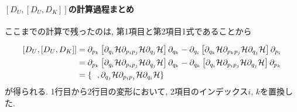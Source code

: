 \paragraph{$[D_{U} , [D_{U} , D_{K}]]$の計算過程まとめ}

ここまでの計算で残ったのは, 第1項目と第2項目1式であることから

\begin{align}
  \left[D_{U}, [D_{U}, D_{K}]\right]
  &=
  \partial_{p_{k}}
  \left[
    \partial_{q_{i}}       \mathcal{H}
    \partial_{p_{i} p_{j}} \mathcal{H}
    \partial_{q_{j}}       \mathcal{H}
  \right]
  \partial_{q_{k}}
  -
  \partial_{q_{i}}
  \left[
    \partial_{q_{k}}       \mathcal{H}
    \partial_{p_{k} p_{j}} \mathcal{H}
    \partial_{q_{j}}       \mathcal{H}
  \right]
  \partial_{p_{i}}
  \notag \\
  &=
  \partial_{p_{k}}
  \left[
    \partial_{q_{i}}       \mathcal{H}
    \partial_{p_{i} p_{j}} \mathcal{H}
    \partial_{q_{j}}       \mathcal{H}
  \right]
  \partial_{q_{k}}
  -
  \partial_{q_{k}}
  \left[
    \partial_{q_{i}}       \mathcal{H}
    \partial_{p_{i} p_{j}} \mathcal{H}
    \partial_{q_{j}}       \mathcal{H}
  \right]
  \partial_{p_{k}}
  \notag \\
  &=
  \{~~,
  \partial_{q_{j}}       \mathcal{H}
  \partial_{p_{i} p_{j}} \mathcal{H}
  \partial_{q_{i}}       \mathcal{H}
  \}
  \notag
\end{align}
が得られる.
1行目から2行目の変形において, 2項目のインデックス$i$, $k$を置換した.

